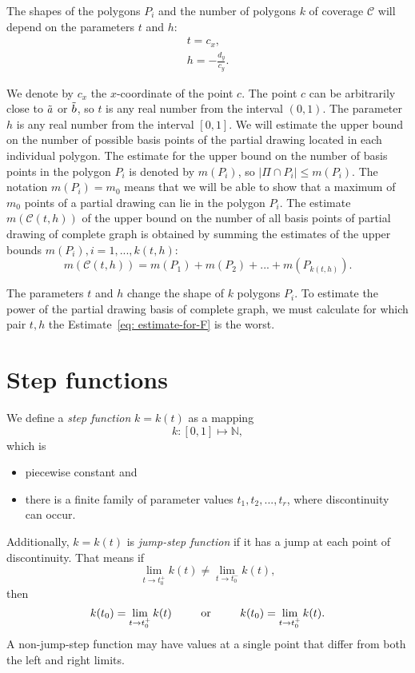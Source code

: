 The shapes of the polygons $P_{i}$ and the number of polygons $k$ of coverage $\mathcal{C}$ will depend on the parameters $t$ and $h$:
\begin{align}
  \label{eq: t}
  t = c_{x}, \\[6pt]
  \label{eq: h}
  h = -\frac{d_{y}}{c_{y}}.
\end{align}

We denote by $c_{x}$ the $x$-coordinate of the point $c$. The point $c$ can be arbitrarily close to $\tilde{a}$ or $\tilde{b}$, so $t$ is any real number from the interval $(0, 1)$. The parameter $h$ is any real number from the interval $[0,1]$. We will estimate the upper bound on the number of possible basis points of the partial drawing located in each individual polygon. The estimate for the upper bound on the number of basis points in the polygon $P_{i}$ is denoted by $m(P_{i})$, so $|\Pi \cap P_{i}| \leq m(P_{i})$. The notation $m(P_{i}) = m_{0}$ means that we will be able to show that a maximum of $m_{0}$ points of a partial drawing can lie in the polygon $P_{i}$. The estimate $m(\mathcal{C}(t, h))$ of the upper bound on the number of all basis points of partial drawing of complete graph is obtained by summing the estimates of the upper bounds $m(P_{i}), i = 1, ..., k(t,h)$:
\begin{equation}
  \label{eq: estimate-for-F}
  m(\mathcal{C}(t,h)) = m(P_{1}) + m(P_{2}) + ... + m(P_{k(t,h)}).
\end{equation}

The parameters $t$ and $h$ change the shape of $k$ polygons $P_{i}$. To estimate the power of the partial drawing basis of complete graph, we must calculate for which pair $t, h$ the Estimate~\eqref{eq: estimate-for-F} is the worst.

\section{Step functions}
We define a \textit{step function} $ k = k (t) $ as a mapping
$$
  k: \left [0,1 \right] \mapsto \mathbb{N},
$$
which is
\begin{itemize}
\item piecewise constant and
\item there is a finite family of parameter values $t_{1}, t_{2}, ..., t_{r}$, where discontinuity can occur.
\end{itemize}

Additionally, $ k = k (t) $ is \textit{jump-step function} if it has a jump at each point of discontinuity. That means if
$$
  \lim_{t \to t_{0} ^{+}} k (t) \neq \lim_{t \to t_{0} ^{-}} k (t),
$$
then
$$
  k (t_{0}) = \lim_{t \to t_{0} ^{+}} k (t) \text{\hspace{0.8cm} or \hspace{0.8cm}} k (t_{0} ) = \lim_{t \to t_{0} ^{+}} k (t).
$$
A non-jump-step function may have values at a single point that differ from both the left and right limits.

